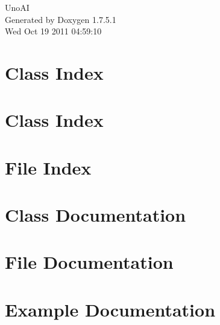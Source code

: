 \documentclass[a4paper]{book}
\begin{document}
\hypersetup{pageanchor=false,citecolor=blue}
\begin{titlepage}
\vspace*{7cm}
\begin{center}
{\Large \-Uno\-A\-I }\\
\vspace*{1cm}
{\large \-Generated by Doxygen 1.7.5.1}\\
\vspace*{0.5cm}
{\small Wed Oct 19 2011 04:59:10}\\
\end{center}
\end{titlepage}
\clearemptydoublepage
{}
\tableofcontents
\clearemptydoublepage
{}
\hypersetup{pageanchor=true,citecolor=blue}
\chapter{\-Class \-Index}

\chapter{\-Class \-Index}

\chapter{\-File \-Index}

\chapter{\-Class \-Documentation}








\chapter{\-File \-Documentation}

















\chapter{\-Example \-Documentation}

\printindex
\end{document}
